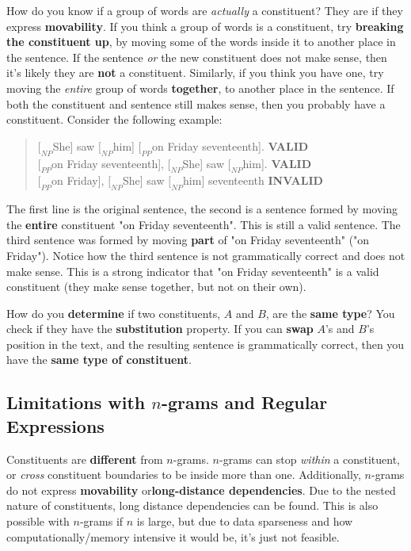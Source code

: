 \documentclass{article}
\begin{document}
How do you know if a group of words are \textit{actually} a constituent? They are if they express \textbf{movability}. If you think a group of words is a constituent, try \textbf{breaking the constituent up}, by moving some of the words inside it to another place in the sentence. If the sentence \textit{or} the new constituent does not make sense, then it's likely they are \textbf{not} a constituent. Similarly, if you think you have one, try moving the \textit{entire} group of words \textbf{together}, to another place in the sentence. If both the constituent and sentence still makes sense, then you probably have a constituent. Consider the following example:
\begin{quote}
	$[_{NP}$She] saw $[_{NP}$him] $[_{PP}$on Friday seventeenth]. \textbf{VALID} \\
	$[_{PP}$on Friday seventeenth], $[_{NP}$She] saw $[_{NP}$him]. \textbf{VALID} \\
	$[_{PP}$on Friday], $[_{NP}$She] saw $[_{NP}$him] seventeenth \textbf{INVALID} \\
\end{quote}
The first line is the original sentence, the second is a sentence formed by moving the \textbf{entire} constituent "on Friday seventeenth". This is still a valid sentence. The third sentence was formed by moving \textbf{part} of "on Friday seventeenth" ("on Friday"). Notice how the third sentence is not grammatically correct and does not make sense. This is a strong indicator that "on Friday seventeenth"  is a valid constituent (they make sense together, but not on their own).

How do you \textbf{determine} if two constituents, $A$ and $B$, are the \textbf{same type}? You check if they have the \textbf{substitution} property. If you can \textbf{swap} $A$'s and $B$'s position in the text, and the resulting sentence is grammatically correct, then you have the \textbf{same type of constituent}.

\subsection{Limitations with $n$-grams and Regular Expressions}

Constituents are \textbf{different} from $n$-grams. $n$-grams can stop \textit{within} a constituent, or \textit{cross} constituent boundaries to be inside more than one. Additionally, $n$-grams do not express \textbf{movability} or\textbf{long-distance dependencies}. Due to the nested nature of constituents, long distance dependencies can be found. This is also possible with $n$-grams if $n$ is large, but due to data sparseness and how computationally/memory intensive it would be, it's just not feasible.
\end{document}
